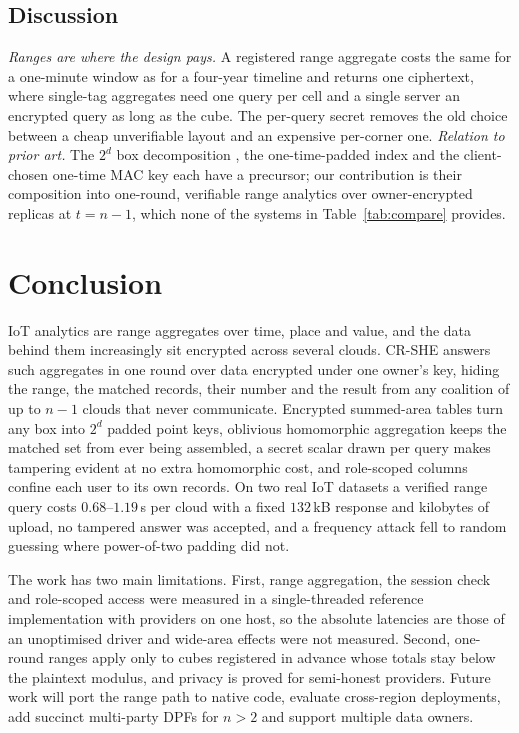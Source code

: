 \subsection{Discussion}
\label{sec:discussion}
\emph{Ranges are where the design pays.} A registered range aggregate costs
the same for a one-minute window as for a four-year timeline and returns one
ciphertext, where single-tag aggregates need one query per cell and a single
server an encrypted query as long as the cube. The per-query secret removes the
old choice between a cheap unverifiable layout and an expensive per-corner one.
\emph{Relation to prior art.} The $2^d$ box decomposition
\citep{boyle2016function}, the one-time-padded index \citep{dory} and the
client-chosen one-time MAC key \citep{li2026silent} each have a precursor; our
contribution is their composition into one-round, verifiable range analytics
over owner-encrypted replicas at $t=n-1$, which none of the systems in
Table~\ref{tab:compare} provides.

\section{Conclusion}
\label{sec:conclusion}
IoT analytics are range aggregates over time, place and value, and the data
behind them increasingly sit encrypted across several clouds. CR-SHE answers
such aggregates in one round over data encrypted under one owner's key, hiding
the range, the matched records, their number and the result from any coalition
of up to $n-1$ clouds that never communicate. Encrypted summed-area tables turn
any box into $2^d$ padded point keys, oblivious homomorphic aggregation keeps
the matched set from ever being assembled, a secret scalar drawn per query
makes tampering evident at no extra homomorphic cost, and role-scoped columns
confine each user to its own records. On two real IoT datasets a verified
range query costs $0.68$--$1.19$\,s per cloud with a fixed $132$\,kB response
and kilobytes of upload, no tampered answer was accepted, and a frequency
attack fell to random guessing where power-of-two padding did not.

The work has two main limitations. First, range aggregation, the session check
and role-scoped access were measured in a single-threaded reference
implementation with providers on one host, so the absolute latencies are those
of an unoptimised driver and wide-area effects were not measured. Second,
one-round ranges apply only to cubes registered in advance whose totals stay
below the plaintext modulus, and privacy is proved for semi-honest providers.
Future work will port the range path to native code, evaluate cross-region
deployments, add succinct multi-party DPFs for $n>2$ and support multiple data
owners.

